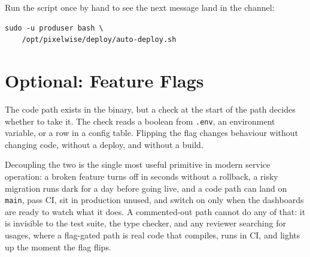 Run the script once by hand to see the next message land in the
channel:

\begin{verbatim}
sudo -u produser bash \
    /opt/pixelwise/deploy/auto-deploy.sh
\end{verbatim}



\newpage
\section{Optional: Feature Flags}

The code path exists in the binary, but a check at the start of the
path decides whether to take it.
The check reads a boolean from \texttt{.env}, an environment
variable, or a row in a config table.
Flipping the flag changes behaviour without changing code, without
a deploy, and without a build.


Decoupling the two is the single most useful primitive in modern
service operation: a broken feature turns off in seconds without a
rollback, a risky migration runs dark for a day before going live,
and a code path can land on \texttt{main}, pass CI, sit in
production unused, and switch on only when the dashboards are
ready to watch what it does.
A commented-out path cannot do any of that: it is invisible to the
test suite, the type checker, and any reviewer searching for
usages, where a flag-gated path is real code that compiles, runs
in CI, and lights up the moment the flag flips.

